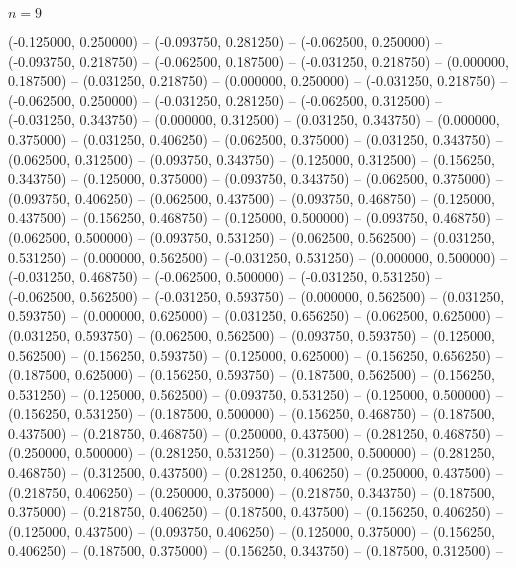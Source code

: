 \begin{zzfrac}{$n = 9$}
\begin{scope}[shift={(0,0.5)}]
  (-0.125000, 0.250000)  --
  (-0.093750, 0.281250)  --
  (-0.062500, 0.250000)  --
  (-0.093750, 0.218750)  --
  (-0.062500, 0.187500)  --
  (-0.031250, 0.218750)  --
  (0.000000, 0.187500)   --
  (0.031250, 0.218750)   --
  (0.000000, 0.250000)   --
  (-0.031250, 0.218750)  --
  (-0.062500, 0.250000)  --
  (-0.031250, 0.281250)  --
  (-0.062500, 0.312500)  --
  (-0.031250, 0.343750)  --
  (0.000000, 0.312500)   --
  (0.031250, 0.343750)   --
  (0.000000, 0.375000)   --
  (0.031250, 0.406250)   --
  (0.062500, 0.375000)   --
  (0.031250, 0.343750)   --
  (0.062500, 0.312500)   --
  (0.093750, 0.343750)   --
  (0.125000, 0.312500)   --
  (0.156250, 0.343750)   --
  (0.125000, 0.375000)   --
  (0.093750, 0.343750)   --
  (0.062500, 0.375000)   --
  (0.093750, 0.406250)   --
  (0.062500, 0.437500)   --
  (0.093750, 0.468750)   --
  (0.125000, 0.437500)   --
  (0.156250, 0.468750)   --
  (0.125000, 0.500000)   --
  (0.093750, 0.468750)   --
  (0.062500, 0.500000)   --
  (0.093750, 0.531250)   --
  (0.062500, 0.562500)   --
  (0.031250, 0.531250)   --
  (0.000000, 0.562500)   --
  (-0.031250, 0.531250)  --
  (0.000000, 0.500000)   --
  (-0.031250, 0.468750)  --
  (-0.062500, 0.500000)  --
  (-0.031250, 0.531250)  --
  (-0.062500, 0.562500)  --
  (-0.031250, 0.593750)  --
  (0.000000, 0.562500)   --
  (0.031250, 0.593750)   --
  (0.000000, 0.625000)   --
  (0.031250, 0.656250)   --
  (0.062500, 0.625000)   --
  (0.031250, 0.593750)   --
  (0.062500, 0.562500)   --
  (0.093750, 0.593750)   --
  (0.125000, 0.562500)   --
  (0.156250, 0.593750)   --
  (0.125000, 0.625000)   --
  (0.156250, 0.656250)   --
  (0.187500, 0.625000)   --
  (0.156250, 0.593750)   --
  (0.187500, 0.562500)   --
  (0.156250, 0.531250)   --
  (0.125000, 0.562500)   --
  (0.093750, 0.531250)   --
  (0.125000, 0.500000)   --
  (0.156250, 0.531250)   --
  (0.187500, 0.500000)   --
  (0.156250, 0.468750)   --
  (0.187500, 0.437500)   --
  (0.218750, 0.468750)   --
  (0.250000, 0.437500)   --
  (0.281250, 0.468750)   --
  (0.250000, 0.500000)   --
  (0.281250, 0.531250)   --
  (0.312500, 0.500000)   --
  (0.281250, 0.468750)   --
  (0.312500, 0.437500)   --
  (0.281250, 0.406250)   --
  (0.250000, 0.437500)   --
  (0.218750, 0.406250)   --
  (0.250000, 0.375000)   --
  (0.218750, 0.343750)   --
  (0.187500, 0.375000)   --
  (0.218750, 0.406250)   --
  (0.187500, 0.437500)   --
  (0.156250, 0.406250)   --
  (0.125000, 0.437500)   --
  (0.093750, 0.406250)   --
  (0.125000, 0.375000)   --
  (0.156250, 0.406250)   --
  (0.187500, 0.375000)   --
  (0.156250, 0.343750)   --
  (0.187500, 0.312500)   --

\end{scope}
\end{zzfrac}
